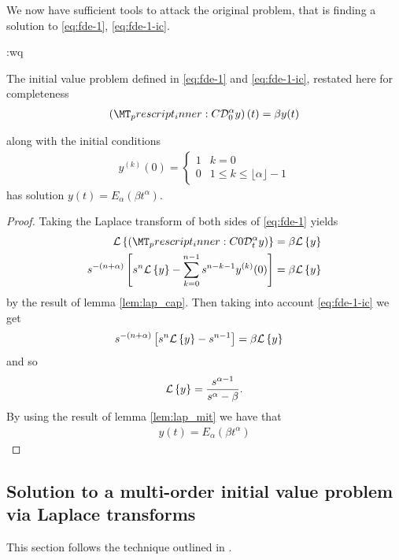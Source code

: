 We now have sufficient tools to attack the original problem, that is finding a solution to \eqref{eq:fde-1}, \eqref{eq:fde-1-ic}.


:wq
\begin{lemma}
	The initial value problem defined in \eqref{eq:fde-1} and \eqref{eq:fde-1-ic}, restated here for completeness 
	\begin{align}
		\left( \prescript{C}{}{\mathcal{D}_0^\alpha}y \right)(t) = \beta y(t) 
	\end{align}

	along with the initial conditions 
	\begin{align}
		y^{(k)}(0) = 
		\begin{cases}
			1 & k = 0 \\
			0 & 1 \leq k \leq \lfloor \alpha \rfloor - 1  
		\end{cases}
	\end{align}
	has solution $ y(t) = E_\alpha \left( \beta t^\alpha \right) $.
\end{lemma}
\begin{proof}
	Taking the Laplace transform of both sides of \eqref{eq:fde-1} yields
	\begin{align}
		\laplace{\capder{0}{t}{\alpha}{y}} &= \beta \laplace{y} \\
		s^{-(n+\alpha)} \left[s^n \laplace{y} - \sum_{k=0}^{n-1} s^{n-k-1} y^{(k)}(0) \right] &= \beta \laplace{y}
	\end{align}
	by the result of lemma \ref{lem:lap_cap}. 
	Then taking into account \eqref{eq:fde-1-ic} we get
	\begin{align}
		s^{-(n+\alpha)} \left[s^n \mathcal{L} \left\{ y \right\} - s^{n-1}\right] &= \beta \mathcal{L} \left\{ y \right\}
	\end{align}
	and so 
	\begin{align}
		\mathcal{L} \left\{ y \right\} = \frac{s^{\alpha-1}}{s^\alpha - \beta}.
	\end{align}
	By using the result of lemma \ref{lem:lap_mit} we have that 
	\begin{align}
		y(t) = E_\alpha(\beta t^\alpha)
	\end{align}
\end{proof}

\subsection{Solution to a multi-order initial value problem via Laplace transforms}
This section follows the technique outlined in \cite{Podlubny1999}.


